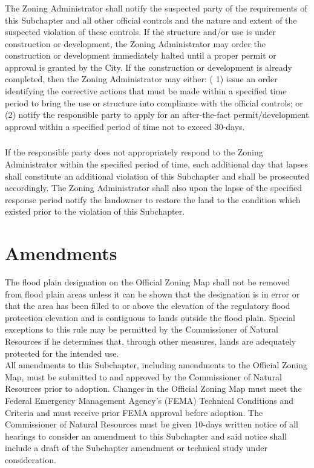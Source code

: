 \subsubsection{}
The Zoning Administrator shall notify the suspected party of the requirements of this Subchapter and all other official controls and the nature and extent of the suspected violation of these controls. If the structure and/or use is under construction or development, the Zoning Administrator may order the construction or development immediately halted until a proper permit or approval is granted by the City. If the construction or development is already completed, then the Zoning Administrator may either: ( 1) issue an order identifying the corrective actions that must be made within a specified time period to bring the use or structure into compliance with the official controls; or (2) notify the responsible party to apply for an after-the-fact permit/development approval within a specified period of time not to exceed 30-days.
\subsubsection{}
If the responsible party does not appropriately respond to the Zoning Administrator within the specified period of time, each additional day that lapses shall constitute an additional violation of this Subchapter and shall be prosecuted accordingly. The Zoning Administrator shall also upon the lapse of the specified response period notify the landowner to restore the land to the condition which existed prior to the violation of this Subchapter.

\section{Amendments}
The flood plain designation on the Official Zoning Map shall not be removed from flood plain areas unless it can be shown that the designation is in error or that the area has been filled to or above the elevation of the regulatory flood protection elevation and is contiguous to lands outside the flood plain. Special exceptions to this rule may be permitted by the Commissioner of Natural Resources if he determines that, through other measures, lands are adequately protected for the intended use.\\
All amendments to this Subchapter, including amendments to the Official Zoning Map, must be submitted to and approved by the Commissioner of Natural Resources prior to adoption. Changes in the Official Zoning Map must meet the Federal Emergency Management Agency's (FEMA) Technical Conditions and Criteria and must receive prior FEMA approval before adoption. The Commissioner of Natural Resources must be given 10-days written notice of all hearings to consider an amendment to this Subchapter and said notice shall include a draft of the Subchapter amendment or technical study under consideration.

